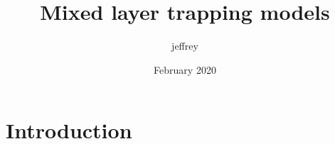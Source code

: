 \documentclass{article}
\title{Mixed layer trapping models}
\author{jeffrey }
\date{February 2020}
\begin{document}
\maketitle

\section{Introduction}
\end{document}
